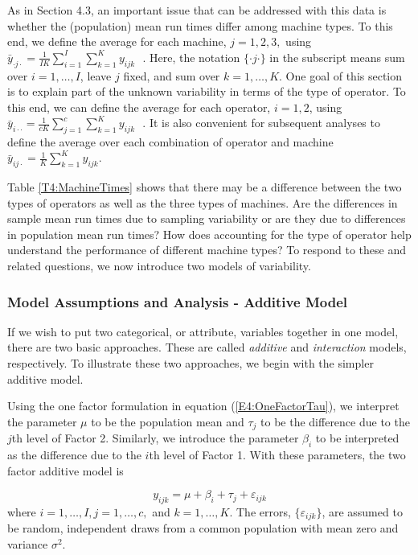 As in Section 4.3, an important issue that can be addressed with
this data is whether the (population) mean run times differ among
machine types. To this end, we define the average for each machine,
$j=1,2,3,$ using $ \bar{y}_{\cdot j\cdot
}=\frac{1}{IK}\sum_{i=1}^{I}\sum_{k=1}^{K}y_{ijk}\text{ }.$ Here,
the notation $\{\cdot j\cdot \}$ in the subscript means sum over $%
i=1,\ldots ,I$, leave $j$ fixed, and sum over $k=1,\ldots ,K$. One
goal of this section is to explain part of the unknown variability
in terms of the type of operator. To this end, we can define the
average for each operator, $i=1,2$, using $\bar{y}_{i\cdot \cdot
}=\frac{1}{cK}\sum_{j=1}^{c}\sum_{k=1}^{K}y_{ijk}\text{ }.$
 It is also convenient for subsequent analyses to define
the average over each combination of operator and machine
$\bar{y}_{ij\cdot }=\frac{1}{K}\sum_{k=1}^{K}y_{ijk}. $

Table \ref{T4:MachineTimes} shows that there may be a difference
between the two types of operators as well as the three types of
machines. Are the differences in sample mean run times due to
sampling variability or are they due to differences in population
mean run times? How does accounting for the type of operator help
understand the performance of different machine types? To respond to
these and related questions, we now introduce two models of
variability.

\linejed

\subsubsection*{Model Assumptions and Analysis - Additive Model}

If we wish to put two categorical, or attribute, variables together
in one model, there are two basic approaches. These are called
\textit{additive} and \textit{interaction} models, respectively. To
illustrate these two approaches, we begin with the simpler additive
model.

Using the one factor formulation in equation
(\ref{E4:OneFactorTau}), we interpret the parameter $\mu $ to be the
population mean and $\tau _{j}$ to be the difference due to the
$j$th level of Factor 2. Similarly, we introduce the parameter
$\beta _{i}$ to be interpreted as the difference due to the $i$th
level of Factor 1. With these parameters, the two factor additive
model is

\begin{equation}  \label{E4:TwoFactorTau}
y_{ijk}=\mu +\beta _{i}+\tau _{j}+\varepsilon_{ijk}
\end{equation}%
where $i=1,\ldots ,I,j=1,\ldots ,c,$ and $k=1,\ldots ,K$. The
errors, $ \{\varepsilon_{ijk}\}$, are assumed to be random,
independent draws from a common population with mean zero and
variance $\sigma ^{2}$.

